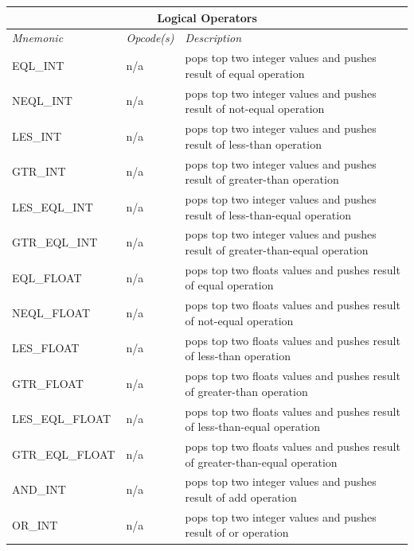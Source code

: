 \documentclass[12pt]{article}
\begin{document}
\begin{center}
{{\vspace{\baselineskip}
\begin{tabular}{| l | l | p{6 cm} |}
\hline
\multicolumn{3}{|c|}{\textbf{Logical Operators}} \\
\hline
\emph{Mnemonic}  &  \emph{Opcode(s)}  &  \emph{Description} \\ \hline \hline
EQL\_INT & n/a & pops top two integer values and pushes result of equal operation \\ \hline
NEQL\_INT & n/a & pops top two integer values and pushes result of not-equal operation \\ \hline
LES\_INT & n/a & pops top two integer values and pushes result of less-than operation \\ \hline
GTR\_INT & n/a & pops top two integer values and pushes result of greater-than operation \\ \hline
LES\_EQL\_INT & n/a & pops top two integer values and pushes result of less-than-equal operation \\ \hline
GTR\_EQL\_INT & n/a & pops top two integer values and pushes result of greater-than-equal operation \\ \hline
EQL\_FLOAT & n/a & pops top two floats values and pushes result of equal operation \\ \hline
NEQL\_FLOAT & n/a & pops top two floats values and pushes result of not-equal operation \\ \hline
LES\_FLOAT & n/a & pops top two floats values and pushes result of less-than operation \\ \hline
GTR\_FLOAT & n/a & pops top two floats values and pushes result of greater-than operation \\ \hline
LES\_EQL\_FLOAT & n/a & pops top two floats values and pushes result of less-than-equal operation \\ \hline
GTR\_EQL\_FLOAT & n/a & pops top two floats values and pushes result of greater-than-equal operation \\ \hline
AND\_INT & n/a & pops top two integer values and pushes result of add operation \\ \hline
OR\_INT & n/a & pops top two integer values and pushes result of or operation \\ \hline
\end{tabular}

}}
\end{center}
\end{document}
